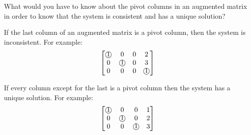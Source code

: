 \documentclass{mathhomework}
\newcommand{\circnum}[1]{\text{\textcircled{#1}}}
\begin{document}
\begin{problem}[1.2\#28]
    What would you have to know about the pivot columns in an augmented matrix in order to know that the system is consistent and has a unique solution?

    \begin{solution}
        If the last column of an augmented matrix is a pivot column, then the system is inconsistent. For example:
        \begin{equation*}
            \begin{bmatrix}
                \circnum{1} & 0 & 0 & 2 \\
                0 & \circnum{1} & 0 & 3 \\
                0 & 0 & 0 & \circnum{1} \\
            \end{bmatrix}
        \end{equation*}
    
        If every column except for the last is a pivot column then the system has a unique solution. For example:
        \begin{equation*}
            \begin{bmatrix}
                \circnum{1} & 0 & 0 & 1 \\
                0 & \circnum{1} & 0 & 2 \\
                0 & 0 & \circnum{1} & 3 \\
            \end{bmatrix}
        \end{equation*}
    \end{solution}
\end{problem}
\end{document}
